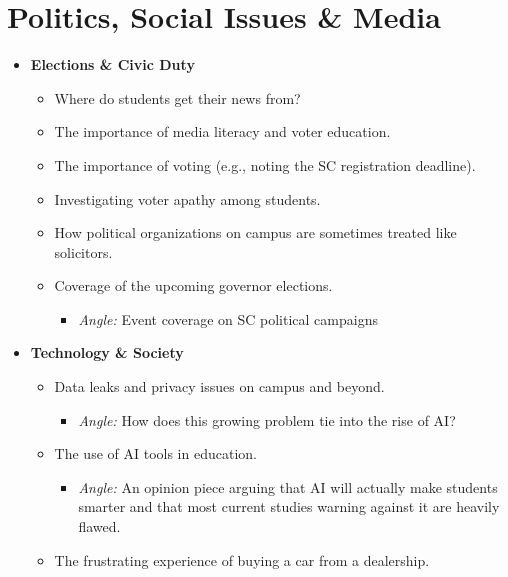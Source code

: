 \documentclass{article}
\begin{document}
\section*{Politics, Social Issues \& Media}

\begin{itemize}
\item
  \textbf{Elections \& Civic Duty}

  \begin{itemize}
  \item
    Where do students get their news from?
  \item
    The importance of media literacy and voter education.
  \item
    The importance of voting (e.g., noting the SC registration
    deadline).
  \item
    Investigating voter apathy among students.
  \item
    How political organizations on campus are sometimes treated like
    solicitors.
  \item
    Coverage of the upcoming governor elections.

    \begin{itemize}
    \item
      \emph{Angle:} Event coverage on SC political campaigns
    \end{itemize}
  \end{itemize}
\item
  \textbf{Technology \& Society}

  \begin{itemize}
  \item
    Data leaks and privacy issues on campus and beyond.

    \begin{itemize}
    \item
      \emph{Angle:} How does this growing problem tie into the rise of
      AI?
    \end{itemize}
  \item
    The use of AI tools in education.

    \begin{itemize}
    \item
      \emph{Angle:} An opinion piece arguing that AI will actually make
      students smarter and that most current studies warning against it
      are heavily flawed.
    \end{itemize}
  \item
    The frustrating experience of buying a car from a dealership.


\end{itemize}
\end{itemize}
\end{document}
